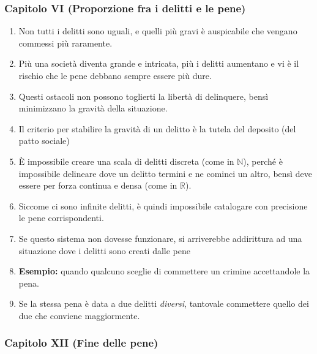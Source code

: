 \documentclass{article}
\begin{document}
\newpage
\subsubsection{Capitolo VI (Proporzione fra i delitti e le pene)}

\begin{enumerate}
    \item Non tutti i delitti sono uguali, e quelli più gravi è auspicabile che vengano commessi più raramente.
    \item Più una società diventa grande e intricata, più i delitti aumentano e vi è il rischio che le pene debbano sempre essere più dure.
    \item Questi ostacoli non possono toglierti la libertà di delinquere, bensì minimizzano
    la gravità della situazione.
    \item Il criterio per stabilire la gravità di un delitto è la tutela del deposito (del patto sociale)
    \item È impossibile creare una scala di delitti discreta (come in \(\mathbb{N}\)), perché è impossibile delineare dove
    un delitto termini e ne cominci un altro, bensì deve essere per forza continua e densa (come in \(\mathbb{R}\)).
    \item Siccome ci sono infinite delitti, è quindi impossibile catalogare con precisione le pene corrispondenti.
    \item Se questo sistema non dovesse funzionare, si arriverebbe addirittura ad una situazione dove i delitti
    sono creati dalle pene
    \item \textbf{Esempio:} quando qualcuno sceglie di commettere un crimine accettandole la pena.
    \item Se la stessa pena è data a due delitti \textit{diversi}, tantovale commettere quello dei due che conviene maggiormente.
\end{enumerate}

\newpage
\subsubsection{Capitolo XII (Fine delle pene)}
\end{document}
